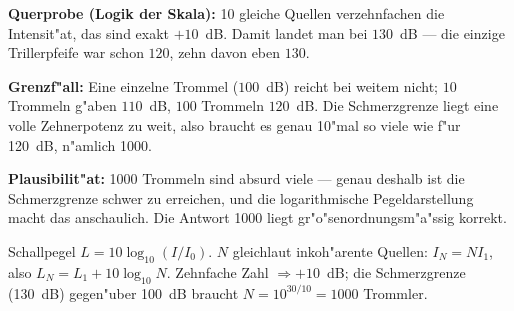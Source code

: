 \begin{kontrolle}
\textbf{Querprobe (Logik der Skala):} 10 gleiche Quellen verzehnfachen die
Intensit"at, das sind exakt $+10$~dB. Damit landet man bei $130$~dB --- die
einzige Trillerpfeife war schon $120$, zehn davon eben $130$. \checkmark

\textbf{Grenzf"all:} Eine einzelne Trommel ($100$~dB) reicht bei weitem
nicht; $10$ Trommeln g"aben $110$~dB, $100$ Trommeln $120$~dB. Die
Schmerzgrenze liegt eine volle Zehnerpotenz zu weit, also braucht es genau
10"mal so viele wie f"ur 120~dB, n"amlich 1000. \checkmark

\textbf{Plausibilit"at:} 1000 Trommeln sind absurd viele --- genau deshalb ist
die Schmerzgrenze schwer zu erreichen, und die logarithmische
Pegeldarstellung macht das anschaulich. Die Antwort 1000 liegt
gr"o"senordnungsm"a"ssig korrekt.
\end{kontrolle}

\begin{merksatz}
Schallpegel $L=10\log_{10}(I/I_0)$. $N$ gleichlaut inkoh"arente Quellen:
$I_N=N I_1$, also $L_N=L_1+10\log_{10}N$. Zehnfache Zahl $\Rightarrow+10$~dB;
die Schmerzgrenze (130~dB) gegen"uber 100~dB braucht
$N=10^{30/10}=1000$ Trommler.
\end{merksatz}
